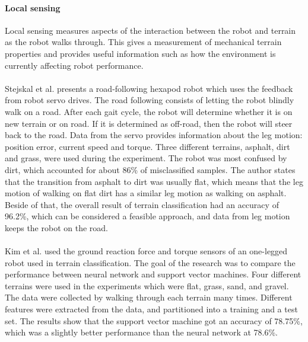 \documentclass[USenglish]{ifimaster}  %
\begin{document}
\paragraph{Local sensing}
Local sensing measures aspects of the interaction between the robot and terrain as the robot walks through. This gives a measurement of mechanical terrain properties and provides useful information such as how the environment is currently affecting robot performance. 
\\
\\ 
Stejskal et al. \cite{7487544} presents a road-following hexapod robot which uses the feedback from robot servo drives. The road following consists of letting the robot blindly walk on a road. After each gait cycle, the robot will determine whether it is on new terrain or on road. If it is determined as off-road, then the robot will steer back to the road. Data from the servo provides information about the leg motion: position error, current speed and torque. Three different terrains, asphalt, dirt and grass, were used during the experiment. The robot was most confused by dirt, which accounted for about 86\% of misclassified samples. The author states that the transition from asphalt to dirt was usually flat, which means that the leg motion of walking on flat dirt has a similar leg motion as walking on asphalt. Beside of that, the overall result of terrain classification had an accuracy of 96.2\%, which can be considered a feasible approach, and data from leg motion keeps the robot on the road.
\\
\\
Kim et al. \cite{5602459} used the ground reaction force and torque sensors of an one-legged robot used in terrain classification. The goal of the research was to compare the performance between neural network and support vector machines. Four different terrains were used in the experiments which were flat, grass, sand, and gravel. The data were collected by walking through each terrain many times. Different features were extracted from the data, and partitioned into a training and a test set. The results show that the support vector machine got an accuracy of 78.75\%, which was a slightly better performance than the neural network at 78.6\%.
\\
\\
\end{document}
